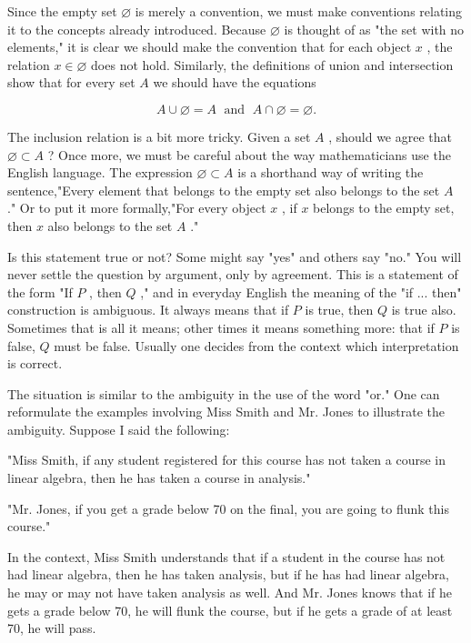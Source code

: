 Since the empty set \(\varnothing\) is merely a convention, we must make conventions relating it to the concepts already introduced. Because \(\varnothing\) is thought of as "the set with no elements," it is clear we should make the convention that for each object \(x\) , the relation \(x \in  \varnothing\) does not hold. Similarly, the definitions of union and intersection show that for every set \(A\) we should have the equations

\[
A \cup  \varnothing  = A\;\text{ and }\;A \cap  \varnothing  = \varnothing .
\]

The inclusion relation is a bit more tricky. Given a set \(A\) , should we agree that \(\varnothing  \subset  A\) ? Once more, we must be careful about the way mathematicians use the English language. The expression \(\varnothing  \subset  A\) is a shorthand way of writing the sentence,"Every element that belongs to the empty set also belongs to the set \(A\) ." Or to put it more formally,"For every object \(x\) , if \(x\) belongs to the empty set, then \(x\) also belongs to the set \(A\) ."

Is this statement true or not? Some might say "yes" and others say "no." You will never settle the question by argument, only by agreement. This is a statement of the form "If \(P\) , then \(Q\) ," and in everyday English the meaning of the "if ... then" construction is ambiguous. It always means that if \(P\) is true, then \(Q\) is true also. Sometimes that is all it means; other times it means something more: that if \(P\) is false, \(Q\) must be false. Usually one decides from the context which interpretation is correct.

The situation is similar to the ambiguity in the use of the word "or." One can reformulate the examples involving Miss Smith and Mr. Jones to illustrate the ambiguity. Suppose I said the following:

"Miss Smith, if any student registered for this course has not taken a course in linear algebra, then he has taken a course in analysis."

"Mr. Jones, if you get a grade below 70 on the final, you are going to flunk this course."

In the context, Miss Smith understands that if a student in the course has not had linear algebra, then he has taken analysis, but if he has had linear algebra, he may or may not have taken analysis as well. And Mr. Jones knows that if he gets a grade below 70, he will flunk the course, but if he gets a grade of at least 70, he will pass.

